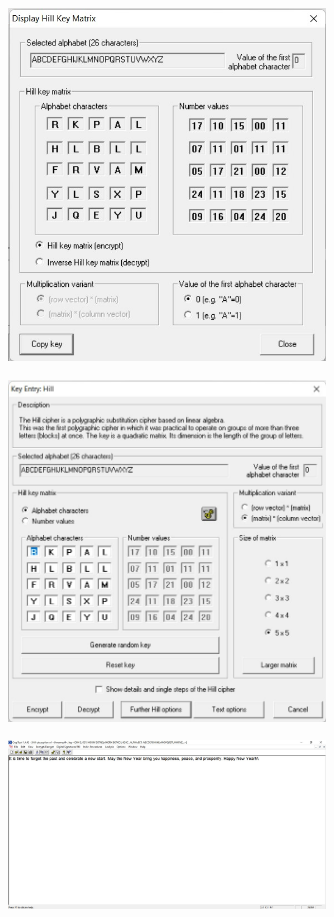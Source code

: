 \documentclass{article}
\begin{document}
\begin{figure}[H]
    \centering
    \includegraphics[width=0.75\textwidth]{figures/6a2.jpg}
    \caption
	{}
    \label{fig:fig1}
\end{figure}
\begin{figure}[H]
    \centering
    \includegraphics[width=0.75\textwidth]{figures/6a3.jpg}
    \caption
	{}
    \label{fig:fig1}
\end{figure}
\begin{figure}[H]
    \centering
    \includegraphics[width=0.75\textwidth]{figures/6a4.jpg}
    \caption
	{}
    \label{fig:fig1}
\end{figure}
\end{document}
